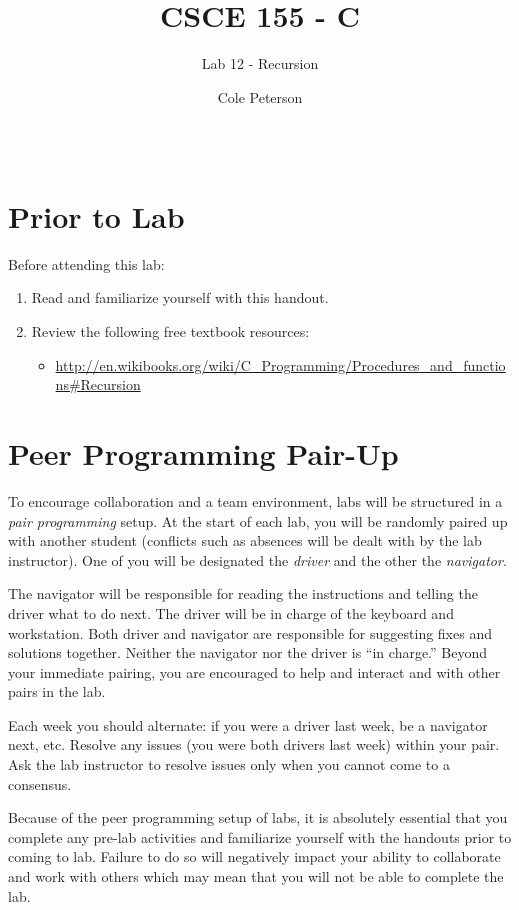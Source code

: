 \documentclass[12pt]{scrartcl}
\title{CSCE 155 - C}
\subtitle{Lab 12 - Recursion}
\author{Cole Peterson}
\date{~}
\begin{document}
\maketitle

\section*{Prior to Lab}

Before attending this lab:
\begin{enumerate}
  \item Read and familiarize yourself with this handout.
  \item Review the following free textbook resources:
	\begin{itemize}
  	  \item \url{http://en.wikibooks.org/wiki/C_Programming/Procedures_and_functions#Recursion}
	\end{itemize}
\end{enumerate}

\section*{Peer Programming Pair-Up}

To encourage collaboration and a team environment, labs will be
structured in a \emph{pair programming} setup.  At the start of
each lab, you will be randomly paired up with another student 
(conflicts such as absences will be dealt with by the lab instructor).
One of you will be designated the \emph{driver} and the other
the \emph{navigator}.  

The navigator will be responsible for reading the instructions and
telling the driver what to do next.  The driver will be in charge of the
keyboard and workstation.  Both driver and navigator are responsible
for suggesting fixes and solutions together.  Neither the navigator
nor the driver is ``in charge.''  Beyond your immediate pairing, you
are encouraged to help and interact and with other pairs in the lab.

Each week you should alternate: if you were a driver last week, 
be a navigator next, etc.  Resolve any issues (you were both drivers
last week) within your pair.  Ask the lab instructor to resolve issues
only when you cannot come to a consensus.  

Because of the peer programming setup of labs, it is absolutely 
essential that you complete any pre-lab activities and familiarize
yourself with the handouts prior to coming to lab.  Failure to do
so will negatively impact your ability to collaborate and work with 
others which may mean that you will not be able to complete the
lab.  
\end{document}
